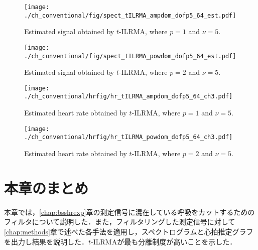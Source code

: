 \begin{figure}[tb]
\centering
\texttt{[image: ./ch\_conventional/fig/spect\_tILRMA\_ampdom\_dofp5\_64\_est.pdf]}
\caption{Estimated signal obtained by $t$-ILRMA, where $p=1$ and $\nu=5$.}
\label{fig:stilrmaa5}
\end{figure}

\begin{figure}[tb]
\centering
\texttt{[image: ./ch\_conventional/fig/spect\_tILRMA\_powdom\_dofp5\_64\_est.pdf]}
\caption{Estimated signal obtained by $t$-ILRMA, where $p=2$ and $\nu=5$.}
\label{fig:stilrmap5}
\end{figure}

\begin{figure}[tb]
\centering
\texttt{[image: ./ch\_conventional/hrfig/hr\_tILRMA\_ampdom\_dofp5\_64\_ch3.pdf]}
\caption{Estimated heart rate obtained by $t$-ILRMA, where $p=1$ and $\nu=5$.}
\label{fig:hrtilrmaa5}
\end{figure}

\begin{figure}[tb]
\centering
\texttt{[image: ./ch\_conventional/hrfig/hr\_tILRMA\_powdom\_dofp5\_64\_ch3.pdf]}
\caption{Estimated heart rate obtained by $t$-ILRMA, where $p=2$ and $\nu=5$.}
\label{fig:hrtilrmap5}
\end{figure}

\section{本章のまとめ}
\label{sec:conv:conclusion5}
本章では，\ref{chap:bsshrexp}章の測定信号に混在している呼吸をカットするためのフィルタについて説明した．また，フィルタリングした測定信号に対して\ref{chap:methods}章で述べた各手法を適用し，スペクトログラムと心拍推定グラフを出力し結果を説明した．$t$-ILRMAが最も分離制度が高いことを示した．